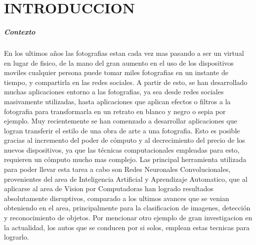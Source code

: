 \documentclass[a4paper,12pt,spanish]{book}
\begin{document}
\tableofcontents 

\chapter{INTRODUCCION}
  \paragraph{Contexto}
    En los ultimos años las fotografias estan cada vez mas pasando a ser un virtual en lugar de fisico, de la mano del gran aumento en el uso de los dispositivos moviles 
    cualquier persona puede tomar miles fotografias en un instante de tiempo, y compartirla en las redes sociales.
    A partir de esto, se han desarrollado muchas aplicaciones entorno a las fotografias, ya sea desde redes sociales masivamente utilizadas, hasta aplicaciones que aplican efectos o filtros 
    a la fotografia para transformarla en un retrato en blanco y negro o sepia por ejemplo.
    Muy recientemente se han comenzado a desarrollar aplicaciones que logran transferir el estilo de una obra de arte a una fotografia. Esto es posible gracias al incremento 
    del poder de cómputo y al decrecimiento del precio de los nuevos dispositivos, ya que las técnicas computacionales empleadas para esto, requieren un cómputo mucho mas complejo.
    Las principal herramienta utilizada para poder llevar esta tarea a cabo son Redes Neuronales Convolucionales, provenientes del area de  
    Inteligencia Artificial y Aprendizaje Automatico, que al aplicarse al area de Vision por Computadoras han logrado resultados absolutamente disruptivos, 
    comparado a los ultimos avances que se venian obteniendo en el area, principalmente para la clasificacion de imagenes, detección y reconocimiento de objetos.
    Por mencionar otro ejemplo de gran investigacion en la actualidad, los autos que se conducen por si solos, emplean estas tecnicas para lograrlo.
\end{document}
